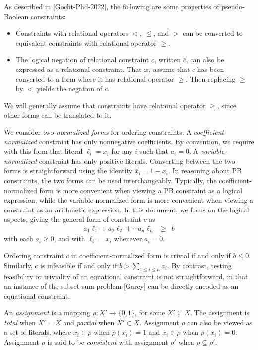 \documentclass{easychair}
\renewcommand{\obar}[1]{\overline{#1}}
\newcommand{\lit}{\ell}
\newcommand{\assign}{\rho}
\begin{document}
As described in [Gocht-Phd-2022], the following are some properties of pseudo-Boolean constraints:
\begin{itemize}
\item Constraints with relational operators $<$, $\leq$, and $>$ can be
  converted to equivalent constraints with relational operator $\geq$.
\item
The logical negation of relational constraint $c$, written $\obar{c}$,
can also be expressed as a relational constraint.  That is, assume that $c$
has been converted to a form where it has relational operator $\geq$.
Then replacing $\geq$ by $<$ yields the negation of $c$.  
\end{itemize}
We will generally
assume that constraints have relational operator $\geq$, since other
forms can be translated to it.

We consider two {\em normalized forms} for ordering constraints: A
{\em coefficient-normalized} constraint has only nonnegative
coefficients.  By convention, we require with this form that literal $\lit_i = x_i$ for any $i$ such that $a_i = 0$.
A {\em variable-normalized} constraint has only
positive literals.  Converting between the two forms is
straightforward using the identity $\obar{x}_i = 1-x_i$.  In reasoning
about PB constraints, the two forms can be used interchangeably.
Typically, the coefficient-normalized form is more convenient when
viewing a PB constraint as a logical expression, while the
variable-normalized form is more convenient when viewing a constraint
as an arithmetic expression.  In this document, we focus on the logical
aspects, giving the general form of constraint $c$ as
\begin{eqnarray}
a_1 \lit_1 + a_2 \lit_2 + \cdots a_n \lit_n & \geq & b \label{eqn:coeff-normalized}
\end{eqnarray}
with each $a_{i} \geq 0$, and with $\lit_{i} = x_i$ whenever $a_i = 0$.

Ordering constraint $c$ in coefficient-normalized form is trivial if and only
if $b \leq 0$.  Similarly, $c$ is infeasible if and only if
$b > \sum_{1 \leq i \leq n} {a_{i}}$.  By contrast, testing feasibility or triviality
of an equational constraint is not straightforward, in that an instance of the
subset sum problem [Garey] can be directly encoded as an equational
constraint.

An {\em assignment} is a mapping $\assign : X' \rightarrow \{0,1\}$,
for some $X' \subseteq X$.  The assignment is {\em total} when
$X' = X$ and {\em partial} when $X' \subset X$.  Assignment $\assign$ can
also be viewed as a set of literals, where $x_i \in \assign$ when
$\assign(x_i) = 1$ and $\obar{x}_i \in \assign$ when $\assign(x_i) = 0$.
Assignment $\assign$ is said to be \emph{consistent} with assignment $\assign'$ when $\assign \subseteq \assign'$.
\end{document}
